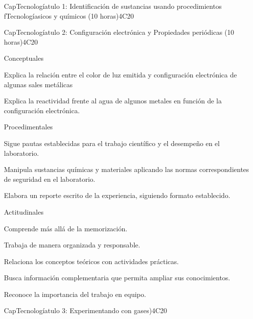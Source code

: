 \begin{syllabus}
\begin{unit}{CapTecnologíatulo 1: Identificación de sustancias usando procedimientos fTecnologíasicos y químicos (10 horas)}{}{}{4}{C20}
   \begin{learningoutcomes}
      \item 
   \end{learningoutcomes}
\end{unit}

\begin{unit}{CapTecnologíatulo 2: Configuración electrónica y Propiedades periódicas (10 horas)}{}{}{4}{C20}

Conceptuales

\begin{topics}
      \item Explica la relación entre el color de luz emitida y configuración electrónica de algunas sales metálicas
      \item Explica la reactividad frente al agua de algunos metales en función de la configuración electrónica.
   \end{topics}
   
   Procedimentales

\begin{topics}
      \item Sigue pautas establecidas para el trabajo científico y el desempeño en el laboratorio.
      \item Manipula sustancias químicas y materiales aplicando las normas correspondientes de seguridad en el laboratorio.
      \item Elabora un reporte escrito de la experiencia, siguiendo formato establecido.
   \end{topics}
   
   Actitudinales

\begin{topics}
      \item Comprende más allá de la memorización.
      \item Trabaja de manera organizada y responsable.
      \item Relaciona los conceptos teóricos con actividades prácticas.
      \item Busca información complementaria que permita ampliar sus conocimientos.
     \item Reconoce la importancia del trabajo en equipo.
   \end{topics}

\end{unit}

\begin{unit}{CapTecnologíatulo 3: Experimentando con gases)}{}{}{4}{C20}


\end{unit}
\end{syllabus}
